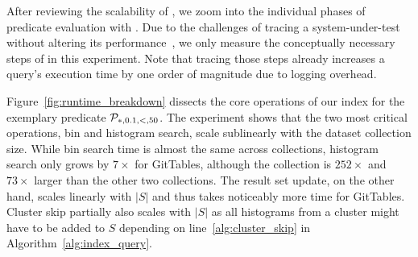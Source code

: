 After reviewing the scalability of \system{}, we zoom into the individual phases of predicate evaluation with \approximate{}.
Due to the challenges of tracing a system-under-test without altering its performance~\cite{jain_art_1991}, we only measure the conceptually necessary steps of \system{} in this experiment.
Note that tracing those steps already increases a query's execution time by one order of magnitude due to logging overhead.

Figure~\ref{fig:runtime_breakdown} dissects the core operations of our index for the exemplary predicate $\mathcal{P}_{*, 0.1, <, 50}$.
The experiment shows that the two most critical operations, bin and histogram search, scale sublinearly with the dataset collection size.
While bin search time is almost the same across collections, histogram search only grows by $7\times$ for GitTables, although the collection is $252\times$ and $73\times$ larger than the other two collections.
The result set update, on the other hand, scales linearly with $|S|$ and thus takes noticeably more time for GitTables.
Cluster skip partially also scales with $|S|$ as all histograms from a cluster might have to be added to $S$ depending on line~\ref{alg:cluster_skip} in Algorithm~\ref{alg:index_query}.

\paragraph{\exact{}}

